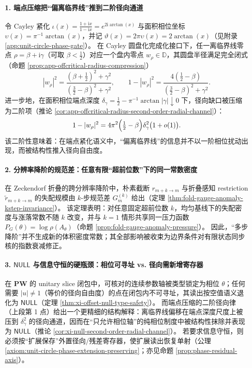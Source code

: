 \paragraph{1. 端点压缩把“偏离临界线”推到二阶径向通道}
令 Cayley 紧化 \(\iota(x)=\frac{1+\mathrm{i}x}{1-\mathrm{i}x}=e^{2\mathrm{i}\arctan(x)}\) 与面积相位坐标 \(\upsilon(x)=\pi^{-1}\arctan(x)\)，并记 \(\vartheta(x)=2\pi\upsilon(x)=2\arctan(x)\)（见附录 \ref{app:unit-circle-phase-gate}）。
在 Cayley 圆盘化完成化接口下，任一离临界线零点 \(\rho=\beta+\mathrm{i}\gamma\)（可取 \(\beta<\tfrac12\)）对应一个盘内零点 \(w_\rho\in\mathbb{D}\)，其圆盘半径满足完全闭式（命题 \ref{prop:app-offcritical-radius-compression}）
\[
|w_\rho|^{2}=\frac{(\beta+\tfrac12)^{2}+\gamma^{2}}{(\tfrac32-\beta)^{2}+\gamma^{2}},
\qquad
1-|w_\rho|^2=\frac{4(\tfrac12-\beta)}{(\tfrac32-\beta)^2+\gamma^2}.
\]
进一步地，在面积相位端点深度 \(\delta_\gamma=\tfrac12-\pi^{-1}\arctan|\gamma|\downarrow 0\) 下，径向缺口被压缩为二阶项（推论 \ref{cor:app-offcritical-radius-second-order-radial-channel}）：
\[
1-|w_\rho|^2
=4\pi^2\Bigl(\tfrac12-\beta\Bigr)\delta_\gamma^2\bigl(1+o(1)\bigr).
\]
该二阶性意味着：在端点紧化语义中，“偏离临界线”的信息并不以一阶相位扰动出现，而被结构性推入径向自由度。

\paragraph{2. 分辨率降阶的规范差：任意有限“超前位数”下的同一常数密度}
在 Zeckendorf 折叠的跨分辨率降阶中，朴素截断 \(r_{m+k\to m}\) 与折叠感知 restriction \(\widetilde r_{m+k\to m}\) 的失配规模由 \(k\)-步规范差 \(G_m^{(k)}\) 给出（定理 \ref{thm:fold-gauge-anomaly-kstep-invariance}）。
该定理表明：对任意固定超前位数 \(k\)，均匀基线下的失配密度与涨落常数不随 \(k\) 改变，并与 \(k=1\) 情形共享同一压力函数 \(P_G(\theta)=\log\rho(A_\theta)\)（命题 \ref{prop:fold-gauge-anomaly-pressure}）。
因此，“多步降阶”并不生成新的体积密度常数；其全部影响被收束为边界条件对有限状态同步核的指数衰减修正。

\paragraph{3. \texorpdfstring{$\mathsf{NULL}$}{NULL} 与信息守恒的硬瓶颈：相位可寻址 vs. 径向需新增寄存器}
在 \(\mathbf{PW}\) 的 unitary slice 闭包中，可核对的连续参数轴被类型锁定为相位 \(\theta\)；任何需要 \(|u|\neq 1\)（等价的径向自由度）的点在闭包内不可寻址，其读出按空值语义退化为 \(\mathsf{NULL}\)（定理 \ref{thm:xi-offset-null-type-safety}）。
而端点压缩的二阶径向律（上段第 1 点）给出一个更精细的结构解释：离临界线偏移在端点深度尺度上被压到 \(\delta_\gamma^2\) 的径向通道，因而在“只允许相位轴”的纯相位制度中被结构性抹除并表现为 \(\mathsf{NULL}\)（推论 \ref{cor:xi-null-second-order-radial-channel}）。
若要求信息守恒，则必须按“扩展保存”外置径向/残差寄存器，使扩展读出恢复单射（公理 \ref{axiom:unit-circle-phase-extension-preserving}；亦见命题 \ref{prop:phase-residual-axis}）。


